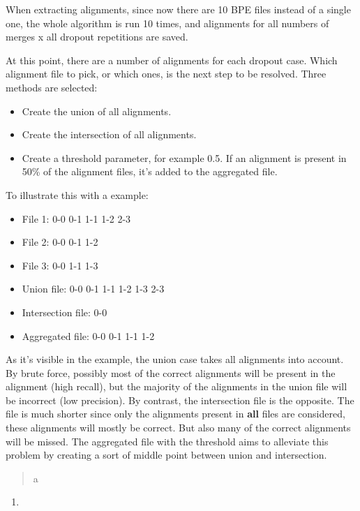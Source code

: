 When extracting alignments, since now there are 10 BPE files instead of a single one, the whole algorithm is run 10 times, and alignments for all numbers of merges x all dropout repetitions are saved.

At this point, there are a number of alignments for each dropout case. Which alignment file to pick, or which ones, is the next step to be resolved. Three methods are selected:

\begin{itemize}
	\item Create the union of all alignments.
	\item Create the intersection of all alignments.
	\item Create a threshold parameter, for example 0.5. If an alignment is present in 50\% of the alignment files, it's added to the aggregated file.
\end{itemize}

To illustrate this with a example:

\begin{itemize}
	\item File 1: 0-0 0-1 1-1 1-2 2-3
	\item File 2: 0-0 0-1 1-2
	\item File 3: 0-0 1-1 1-3
	\item Union file: 0-0 0-1 1-1 1-2 1-3 2-3
	\item Intersection file: 0-0
	\item Aggregated file: 0-0 0-1 1-1 1-2
\end{itemize}

As it's visible in the example, the union case takes all alignments into account. By brute force, possibly most of the correct alignments will be present in the alignment (high recall), but the majority of the alignments in the union file will be incorrect (low precision). By contrast, the intersection file is the opposite. The file is much shorter since only the alignments present in \textbf{all} files are considered, these alignments will mostly be correct. But also many of the correct alignments will be missed. The aggregated file with the threshold aims to alleviate this problem by creating a sort of middle point between union and intersection.

\begin{python}

\end{python}

\begin{quote}
	a\\
\end{quote}

\begin{enumerate}
	\item 
\end{enumerate}